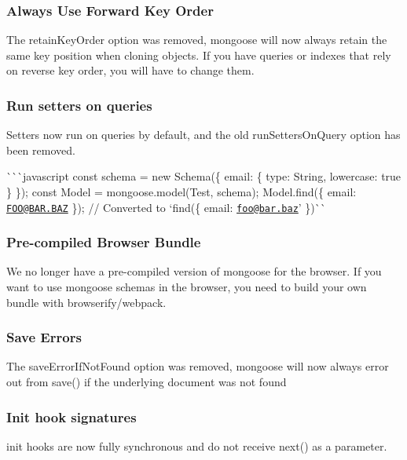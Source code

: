 \subsubsection*{Always Use Forward Key Order}

The {\ttfamily retain\+Key\+Order} option was removed, mongoose will now always retain the same key position when cloning objects. If you have queries or indexes that rely on reverse key order, you will have to change them.

\subsubsection*{Run setters on queries}

Setters now run on queries by default, and the old {\ttfamily run\+Setters\+On\+Query} option has been removed.

\`{}\`{}\`{}javascript const schema = new Schema(\{ email\+: \{ type\+: String, lowercase\+: true \} \}); const Model = mongoose.\+model(\textquotesingle{}Test\textquotesingle{}, schema); Model.\+find(\{ email\+: \textquotesingle{}\href{mailto:FOO@BAR.BAZ}{\tt F\+O\+O@\+B\+A\+R.\+B\+AZ}\textquotesingle{} \}); // Converted to `find(\{ email\+: \textquotesingle{}\href{mailto:foo@bar.baz}{\tt foo@bar.\+baz}' \}){\ttfamily  }\`{}\`{}

\subsubsection*{Pre-\/compiled Browser Bundle}

We no longer have a pre-\/compiled version of mongoose for the browser. If you want to use mongoose schemas in the browser, you need to build your own bundle with browserify/webpack.

\subsubsection*{Save Errors}

The {\ttfamily save\+Error\+If\+Not\+Found} option was removed, mongoose will now always error out from {\ttfamily save()} if the underlying document was not found

\subsubsection*{Init hook signatures}

{\ttfamily init} hooks are now fully synchronous and do not receive {\ttfamily next()} as a parameter.

